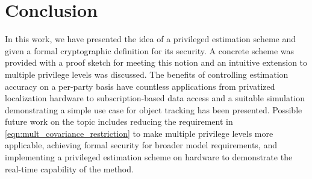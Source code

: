 \documentclass[letterpaper, 10 pt, conference]{ieeeconf}
\begin{document}
% 
%                                               
%                                               
%                                               
% 

\section{Conclusion}\label{sec:conclusion}
In this work, we have presented the idea of a privileged estimation scheme and given a formal cryptographic definition for its security. A concrete scheme was provided with a proof sketch for meeting this notion and an intuitive extension to multiple privilege levels was discussed. The benefits of controlling estimation accuracy on a per-party basis have countless applications from privatized localization hardware to subscription-based data access and a suitable simulation demonstrating a simple use case for object tracking has been presented. Possible future work on the topic includes reducing the requirement in \eqref{eqn:mult_covariance_restriction} to make multiple privilege levels more applicable, achieving formal security for broader model requirements, and implementing a privileged estimation scheme on hardware to demonstrate the real-time capability of the method.













\end{document}
